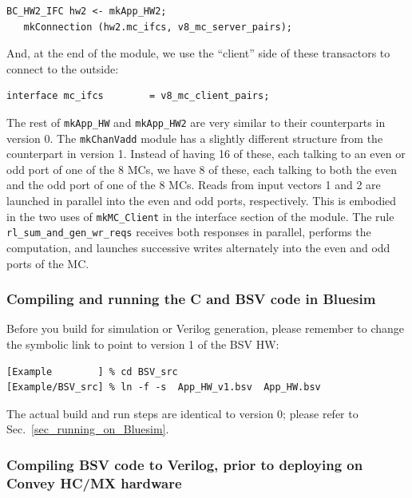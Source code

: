 \documentclass[twoside,letterpaper,11pt]{article}
\begin{document}
\begin{Verbatim}[frame=single, label=App\_HW\_v1.bsv] 
   BC_HW2_IFC hw2 <- mkApp_HW2;
   mkConnection (hw2.mc_ifcs, v8_mc_server_pairs);
\end{Verbatim}

And, at the end of the module, we use the ``client'' side of these
transactors to connect to the outside:

\begin{Verbatim}[frame=single, label=App\_HW\_v1.bsv] 
   interface mc_ifcs        = v8_mc_client_pairs;
\end{Verbatim}

The rest of \verb|mkApp_HW| and \verb|mkApp_HW2| are very similar to
their counterparts in version 0.  The \verb|mkChanVadd| module has a
slightly different structure from the counterpart in version 1.
Instead of having 16 of these, each talking to an even or odd port of
one of the 8 MCs, we have 8 of these, each talking to both the even
and the odd port of one of the 8 MCs.  Reads from input vectors 1 and
2 are launched in parallel into the even and odd ports, respectively.
This is embodied in the two uses of \verb|mkMC_Client| in the
interface section of the module.  The rule
\verb|rl_sum_and_gen_wr_reqs| receives both responses in parallel,
performs the computation, and launches successive writes alternately
into the even and odd ports of the MC.


\subsubsection{Compiling and running the C and BSV code in Bluesim}

Before you build for simulation or Verilog generation, please remember
to change the symbolic link to point to version 1 of the BSV HW:

\begin{Verbatim}[frame=single, label=Properly named App\_HW.bsv application source file] 
[Example        ] % cd BSV_src
[Example/BSV_src] % ln -f -s  App_HW_v1.bsv  App_HW.bsv
\end{Verbatim}

The actual build and run steps are identical to version 0; please
refer to Sec.~\ref{sec_running_on_Bluesim}.


\subsubsection{Compiling BSV code to Verilog, prior to deploying on Convey HC/MX hardware}
\end{document}
